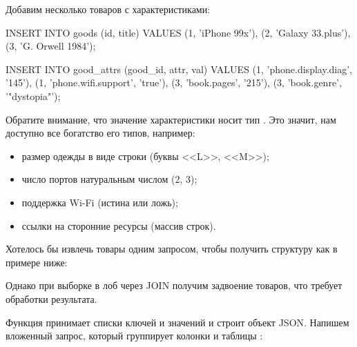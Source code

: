 Добавим несколько товаров с характеристиками:

\begin{english}
  \begin{sql}
INSERT INTO goods (id, title)
VALUES
  (1, 'iPhone 99x'),
  (2, 'Galaxy 33.plus'),
  (3, 'G. Orwell 1984');

INSERT INTO good_attrs (good_id, attr, val)
VALUES
  (1, 'phone.display.diag', '145'),
  (1, 'phone.wifi.support', 'true'),
  (3, 'book.pages', '215'),
  (3, 'book.genre', '"dystopia"');
  \end{sql}
\end{english}

Обратите внимание, что значение характеристики носит тип . Это значит, нам доступно все богатство его типов, например:

\begin{itemize}

\item
  размер одежды в виде строки (буквы <<L>>, <<M>>);

\item
  число портов натуральным числом (2, 3);

\item
  поддержка Wi-Fi (истина или ложь);

\item
  ссылки на сторонние ресурсы (массив строк).

\end{itemize}

Хотелось бы извлечь товары одним запросом, чтобы получить структуру как в примере ниже:

\begin{english}
  \begin{clojure}
  \end{clojure}
\end{english}

Однако при выборке в лоб через JOIN получим задвоение товаров, что требует обработки результата.

Функция  принимает списки ключей и значений и строит объект JSON. Напишем вложенный запрос, который группирует колонки  и  таблицы :

